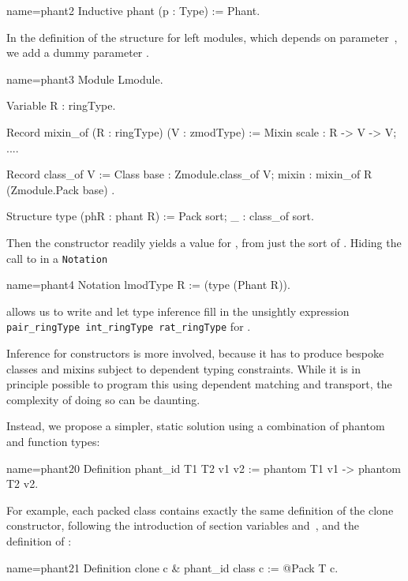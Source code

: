 \begin{coq}{name=phant2}{}
Inductive phant (p : Type) := Phant.
\end{coq}

In the definition of the structure  for left modules, which depends on
 parameter~, we add a dummy  parameter .

\begin{coq}{name=phant3}{}
Module Lmodule.

Variable R : ringType.

Record mixin_of (R : ringType) (V : zmodType) := Mixin {
  scale : R -> V -> V;
  ...}.

Record class_of V := Class {
  base : Zmodule.class_of V;
  mixin : mixin_of R (Zmodule.Pack base)
}.

Structure type (phR : phant R) := Pack {sort; _ : class_of sort}.
\end{coq}

Then the  constructor readily yields a value for ,
from just the sort of . Hiding the call to  in
a \lstinline/Notation/

\begin{coq}{name=phant4}{}
Notation lmodType R := (type (Phant R)).
\end{coq}

allows us to write  and let type inference
fill in the unsightly expression
\lstinline/pair_ringType int_ringType rat_ringType/ for .

Inference for constructors is more involved, because it has to produce
bespoke classes and mixins subject to dependent typing constraints.
While it is in principle possible to program this using dependent
matching and transport, the complexity of doing so can be daunting.

Instead, we propose a simpler, static solution using a combination
of phantom and function types:

\begin{coq}{name=phant20}{}
Definition phant_id T1 T2 v1 v2 := phantom T1 v1 -> phantom T2 v2.
\end{coq}

For example, each packed class contains exactly the same definition of
the clone constructor, following the introduction of
section variables  and~, and the definition of :

\begin{coq}{name=phant21}{}
Definition clone c & phant_id class c := @Pack T c.
\end{coq}

